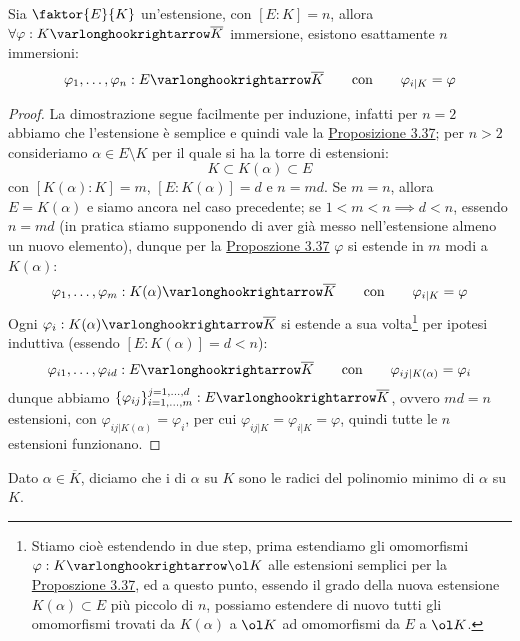 \documentclass[11pt]{scrartcl}
\begin{document}
\pagebreak

\begin{corollary}
    \label{3.39}
    Sia $\faktor{E}{K}$ un'estensione, con $[E:K] = n$, allora $\forall \varphi : K \varlonghookrightarrow \overline K$ immersione, esistono esattamente $n$ immersioni:
    \[ \varphi_1,\ldots,\varphi_n : E \varlonghookrightarrow \overline K \qquad \text{con} \qquad \varphi_{i|K} = \varphi
        \]
\end{corollary}

\begin{proof}
    La dimostrazione segue facilmente per induzione, infatti per $n = 2$ abbiamo che l'estensione è semplice e quindi vale la \hyperref[3.37]{Proposizione 3.37}; per $n>2$ consideriamo
    $\alpha \in E \setminus K$ per il quale si ha la torre di estensioni:
    \[ K \subset K(\alpha) \subset E
        \]
    con $[K(\alpha) : K] = m$, $[E : K(\alpha)] = d$ e $n = md$. Se $m = n$, allora $E = K(\alpha)$ e siamo ancora nel caso precedente; se $1 < m < n \implies d < n$,
    essendo $n = md$ (in pratica stiamo supponendo di aver già messo nell'estensione almeno un nuovo elemento), dunque per la \hyperref[3.37]{Proposzione 3.37} $\varphi$ si estende in $m$ modi a $K(\alpha)$:
    \[ \varphi_1,\ldots,\varphi_m : K(\alpha) \varlonghookrightarrow \overline K \qquad \text{con} \qquad \varphi_{i|K} = \varphi
        \]
    Ogni $\varphi_i : K(\alpha) \varlonghookrightarrow \overline K$ si estende a sua volta\footnote{Stiamo cioè estendendo in due step, prima estendiamo gli omomorfismi $\varphi : K \varlonghookrightarrow \ol K$ alle estensioni semplici per la \hyperref[3.37]{Proposzione 3.37}, ed a questo punto, essendo il grado della nuova 
    estensione $K(\alpha) \subset E$ più piccolo di $n$, possiamo estendere di nuovo tutti gli omomorfismi trovati da $K(\alpha)$ a $\ol K$ ad omomorfismi da $E$ a $\ol K$.} per ipotesi induttiva (essendo $[E : K(\alpha)] = d < n$):
    \[ \varphi_{i1},\ldots,\varphi_{id} : E \varlonghookrightarrow \overline K \qquad \text{con} \qquad \varphi_{ij|K(\alpha)} = \varphi_i
        \]
    dunque abbiamo $\{\varphi_{ij}\}_{i = 1,\ldots,m}^{j = 1,\ldots,d} : E \varlonghookrightarrow \overline K$, ovvero $md = n$ estensioni, con $\varphi_{ij | K(\alpha)} = \varphi_i $, per cui $\varphi_{ij|K} = \varphi_{i | K} = \varphi$, quindi tutte le $n$ estensioni funzionano.
\end{proof}

\begin{definition}
    Dato $\alpha \in \overline K$, diciamo che i  di $\alpha$ su $K$ sono le radici del polinomio minimo di $\alpha$ su $K$. 
\end{definition}
\end{document}
